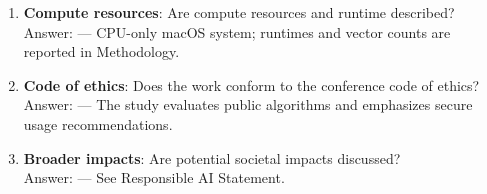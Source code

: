 \begin{enumerate}
  \item \textbf{Compute resources}: Are compute resources and runtime described?\\
  Answer: \answerYes{} — CPU-only macOS system; runtimes and vector counts are reported in Methodology.

  \item \textbf{Code of ethics}: Does the work conform to the conference code of ethics?\\
  Answer: \answerYes{} — The study evaluates public algorithms and emphasizes secure usage recommendations.

  \item \textbf{Broader impacts}: Are potential societal impacts discussed?\\
  Answer: \answerYes{} — See Responsible AI Statement.
\end{enumerate}




